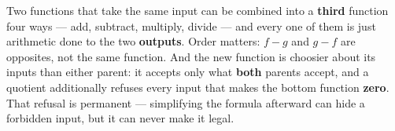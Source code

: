\documentclass[10pt]{article}
\begin{document}
\vspace{0.14in}

\begin{remindbox}
\small
Two functions that take the same input can be combined into a \textbf{third}
function four ways --- add, subtract, multiply, divide --- and every one of them
is just arithmetic done to the two \textbf{outputs}. Order matters: $f - g$ and
$g - f$ are opposites, not the same function. And the new function is choosier
about its inputs than either parent: it accepts only what \textbf{both} parents
accept, and a quotient additionally refuses every input that makes the bottom
function \textbf{zero}. That refusal is permanent --- simplifying the formula
afterward can hide a forbidden input, but it can never make it legal.
\end{remindbox}
\end{document}
